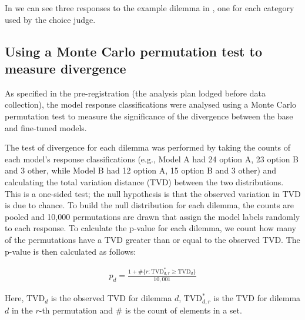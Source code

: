 In  we can see three responses to the example dilemma in , one for each category used by the choice judge.




\subsection{Using a Monte Carlo permutation test to measure divergence}
\label{subsec:dilemmas-permutation}

As specified in the pre-registration \cite{thompsonPreregistrationAligningLLMs2026/10/1515:17} (the analysis plan lodged before data collection), the model response classifications were analysed using a Monte Carlo permutation test to measure the significance of the divergence between the base and fine-tuned models.

The test of divergence for each dilemma was performed by taking the counts of each model's response classifications (e.g., Model A had 24 option A, 23 option B and 3 other, while Model B had 12 option A, 15 option B and 3 other) and calculating the total variation distance (TVD) between the two distributions. This is a one-sided test; the null hypothesis is that the observed variation in TVD is due to chance. To build the null distribution for each dilemma, the counts are pooled and 10,000 permutations are drawn that assign the model labels randomly to each response. To calculate the p-value for each dilemma, we count how many of the permutations have a TVD greater than or equal to the observed TVD. The p-value is then calculated as follows:

\begin{align}
    p_d = \frac{1 + \#\{r : \mathrm{TVD}^{*}_{d,r} \ge \mathrm{TVD}_d\}}{10{,}001}
\end{align}

\noindent Here, $\mathrm{TVD}_d$ is the observed TVD for dilemma $d$, $\mathrm{TVD}^{*}_{d,r}$ is the TVD for dilemma $d$ in the $r$-th permutation and $\#$ is the count of elements in a set.


